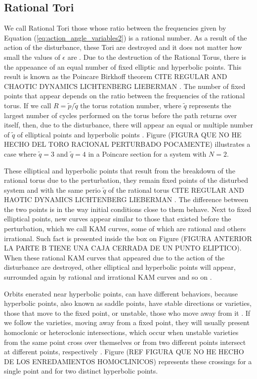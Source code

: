 \subsection{Rational Tori}
We call Rational Tori those whose ratio between the frequencies given by Equation (\ref{eq:action_angle_variables2}) is a rational number. As a result of the action of the disturbance, these Tori are destroyed and it does not matter how small the values of $\epsilon$ are \cite{ottChaosDynamicalSystems2002}. Due to the destruction of the Rational Torus, there is the appeaance of an equal number of fixed elliptic and hyperbolic points. This result is known as the Poincar\´e Birkhoff theorem CITE REGULAR AND CHAOTIC DYNAMICS LICHTENBERG LIEBERMAN . The number of fixed points that appear depends on the ratio between the frequencies of the rational torus. If we call $R=\tilde{p}/\tilde{q}$ the torus rotation number, where $\tilde{q}$ represents the largest number of cycles performed on the torus before the path returns over itself, then, due to the disturbance, there will appear an equal or multiple number of $\tilde{q}$ of elliptical points and hyperbolic points \cite{ottChaosDynamicalSystems2002}. Figure (FIGURA QUE NO HE HECHO DEL TORO RACIONAL PERTURBADO POCAMENTE) illustrates a case where $\tilde{q}=3$ and $\tilde{q}=4$ in a Poincar\´e section for a system with $N=2$.\par

These elliptical and hyperbolic points that result from the breakdown of the rational torus due to the perturbation, they remain fixed points of the disturbed system and with the same perio $\tilde{q}$ of the rational torus CITE REGULAR AND HAOTIC DYNAMICS LICHTENBERG LIEBERMAN . The difference between the two points is in the way initial conditions close to them behave. Next to fixed elliptical points, new curves appear similar to those that existed before the perturbation, which we call KAM curves, some of which are rational and others irrational. Such fact is presented inside the box on Figure (FIGURA ANTERIOR LA PARTE B TIENE UNA CAJA CERRADA DE UN PUNTO ELIPTICO). When these rational KAM curves that appeared due to the action of the disturbance are destroyed, other elliptical and hyperbolic points will appear, surrounded again by rational and irrational KAM curves and so on \cite{ottChaosDynamicalSystems2002}.\par

Orbits enerated near hyperbolic points, can have different behaviors, because hyperbolic points, also known as saddle points, have stable directions or varieties, those that move to the fixed point, or unstable, those who move away from it \cite{ottChaosDynamicalSystems2002}. If we follow the varieties, moving away from a fixed point, they will usually present homoclonic or heteroclonic intersections, which occur when unstable varieties from the same point cross over themselves or from two different points intersect at different points, respectively \cite{ottChaosDynamicalSystems2002}. Figure (REF FIGURA QUE NO HE HECHO DE LOS ENREDAMIENTOS HOMOCLINICOS) represents these crossings for a single point and for two distinct hyperbolic points.\par 

